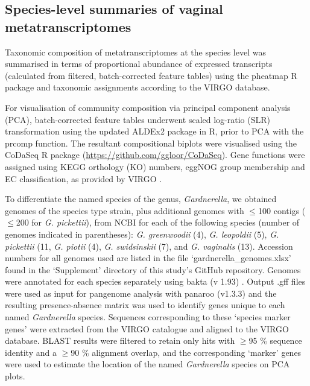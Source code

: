 \documentclass[sn-mathphys,Numbered]{sn-jnl}%
\begin{document}
\subsection{Species-level summaries of vaginal metatranscriptomes}
Taxonomic composition of metatranscriptomes at the species level was summarised in terms of proportional abundance of expressed transcripts (calculated from filtered, batch-corrected feature tables) using the pheatmap R package and taxonomic assignments according to the VIRGO database. 

For visualisation of community composition via principal component analysis (PCA), batch-corrected feature tables underwent scaled log-ratio (SLR) transformation using the updated ALDEx2 package in R, prior to PCA with the prcomp function. The resultant compositional biplots were visualised using the CoDaSeq R package (\url{https://github.com/ggloor/CoDaSeq}). Gene functions were assigned using KEGG orthology (KO) numbers, eggNOG group membership and EC classification, as provided by VIRGO \citep{Ma:2020aa}.

To differentiate the named species of the genus, \textit{Gardnerella}, we obtained genomes of the species type strain, plus additional genomes with $\leq$100 contigs ($\leq$200 for \textit{G. pickettii}), from NCBI for each of the following species (number of genomes indicated in parentheses): \textit{G. greenwoodii} (4), \textit{G. leopoldii} (5), \textit{G. pickettii} (11, \textit{G. piotii} (4), \textit{G. swidsinskii} (7), and \textit{G. vaginalis} (13). Accession numbers for all genomes used are listed in the file `gardnerella\_genomes.xlsx' found in the `Supplement' directory of this study's GitHub repository. Genomes were annotated for each species separately using bakta (v 1.93) \cite{schwengers_bakta_2021}. Output .gff files were used as input for pangenome analysis with panaroo (v1.3.3) \cite{Tonkin-Hill:2020aa} and the resulting presence-absence matrix was used to identify genes unique to each named \textit{Gardnerella} species. Sequences corresponding to these `species marker genes' were extracted from the VIRGO catalogue and aligned to the VIRGO database. BLAST results were filtered to retain only hits with $\geq$95 \% sequence identity and a $\geq$90 \% alignment overlap, and the corresponding `marker' genes were used to estimate the location of the named \textit{Gardnerella} species on PCA plots.
\end{document}
